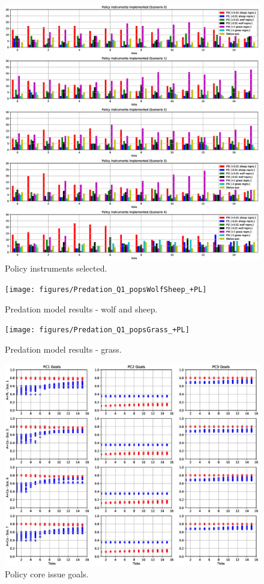 \documentclass[12pt]{article}
\begin{document}
\begin{figure}
\centering
\includegraphics[width = 0.95\linewidth, angle = 0]{figures/PE_PI_selection_+PL}
\caption{Policy instruments selected.}
\label{fig:PE_PI_selection}
\end{figure}

\begin{figure}
\centering
\texttt{[image: figures/Predation\_Q1\_popsWolfSheep\_+PL]}
\caption{Predation model results - wolf and sheep.}
\label{fig:Predation_Q1_popsWolfSheep}
\end{figure}

\begin{figure}
\centering
\texttt{[image: figures/Predation\_Q1\_popsGrass\_+PL]}
\caption{Predation model results - grass.}
\label{fig:Predation_Q1_popsGrass}
\end{figure}

\begin{figure}
\centering
\includegraphics[width = 0.95\linewidth, angle = 0]{figures/PE_PL_PCGoals_+Co}
\caption{Policy core issue goals.}
\label{fig:PE_PL_PCGoals}
\end{figure}
\end{document}
